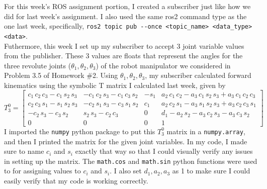 \documentclass{article}
\begin{document}
For this week's ROS assignment portion, I created a subscriber just like how
we did for last week's assignment. I also used the same ros2 command type as
the one last week, specifically,
\lstinline{ros2 topic pub --once <topic_name> <data_type> <data>}.
\vspace{0.17in}
\\Futhermore, this week I set up my subscriber to accept 3 joint variable 
values from the publisher. These 3 values are floats that represent the
angles for the three revolute joints (\(\theta_1, \theta_2, \theta_3\))
of the robot manipulator we considered in Problem 3.5 of Homework \#2. Using
\(\theta_1, \theta_2, \theta_3\), my subscriber calculated forward kinematics
using the symbolic T matrix I calculated last week, given by
\[
    T_3^0 =
    \begin{bmatrix}
        c_{1}\,c_{2}\,c_{3}-c_{1}\,s_{2}\,s_{3} & -c_{1}\,c_{2}\,s_{3}-c_{1}\,c_{3}\,s_{2} & -s_{1} & a_{2}\,c_{1}\,c_{2}-a_{3}\,c_{1}\,s_{2}\,s_{3}+a_{3}\,c_{1}\,c_{2}\,c_{3}\\
        c_{2}\,c_{3}\,s_{1}-s_{1}\,s_{2}\,s_{3} & -c_{2}\,s_{1}\,s_{3}-c_{3}\,s_{1}\,s_{2} & c_{1} & a_{2}\,c_{2}\,s_{1}-a_{3}\,s_{1}\,s_{2}\,s_{3}+a_{3}\,c_{2}\,c_{3}\,s_{1}\\
        -c_{2}\,s_{3}-c_{3}\,s_{2} & s_{2}\,s_{3}-c_{2}\,c_{3} & 0 & d_{1}-a_{2}\,s_{2}-a_{3}\,c_{2}\,s_{3}-a_{3}\,c_{3}\,s_{2}\\
        0 & 0 & 0 & 1
    \end{bmatrix}
\]
I imported the \lstinline{numpy} python package to put this $T_3^0$ matrix in a
\lstinline{numpy.array}, and then I printed the matrix for the given joint variables.
In my code, I made sure to name $c_i$ and $s_i$ exactly that way so that I could
visually verify any issues in setting up the matrix. The \lstinline{math.cos} and
\lstinline{math.sin} python functions were used to for assigning values to $c_i$
and $s_i$. I also set $d_1, a_2, a_3$ as 1 to make sure I could easily verify
that my code is working correctly.
\end{document}
